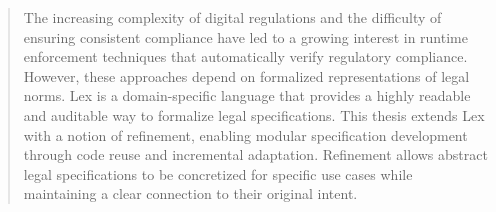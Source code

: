 \begin{abstract}




The increasing complexity of digital regulations and the difficulty of ensuring consistent compliance have led to a growing interest in runtime enforcement techniques that automatically verify regulatory compliance.
However, these approaches depend on formalized representations of legal norms.
Lex is a domain-specific language that provides a highly readable and auditable way to formalize legal specifications.
This thesis extends Lex with a notion of refinement, enabling modular specification development through code reuse and incremental adaptation.
Refinement allows abstract legal specifications to be concretized for specific use cases while maintaining a clear connection to their original intent.

\end{abstract}
